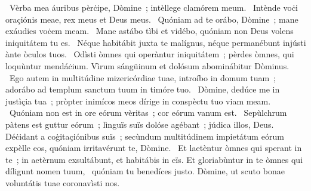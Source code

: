 ~Vèrba mea áuribus pèrċipe, Dòmine~; intèllege clamórem meum. 
~Intènde voċi oraçiónis meae, rex meus et Deus meus. 
~Quóniam ad te orábo, Dòmine~; mane exáudies voċem meam. 
~Mane astábo tìbi et vidébo, quóniam non Deus volens iniquitátem tu es. 
~Néque habitábit juxta te malígnus, néque permanébunt injústi ànte òculos tuos. 
~Odìsti òmnes qui operàntur iniquitátem~; pèrdes òmnes, qui loquùntur mendáċium. Vìrum sángüinum et dolósum abominábitur Dòminus. 
~Ego autem in multitúdine mizericórdiae tuae, introíbo in domum tuam~; adorábo ad templum sanctum tuum in timóre tuo. 
~Dòmine, dedúce me in justìçia tua~; pròpter inimícos meos dírige in conspèctu tuo viam meam. 
~Quóniam non est in ore eórum vèritas~; cor eórum vanum est. 
~Sepùlchrum pàtens est guttur eórum~; lìnguïs suïs dolóse agébant~; júdica illos, Deus. Déċidant a coġitaçiónibus suïs~; secùndum multitúdinem impietátum eórum expèlle eos, quóniam irritavérunt te, Dòmine. 
~Et laetèntur òmnes qui sperant in te~; in aetèrnum exsultábunt, et habitábis in eïs. Et gloriabùntur in te òmnes qui díligunt nomen tuum, 
~quóniam tu benedíces justo. Dòmine, ut scuto bonae voluntátis tuae coronavìsti nos. 
